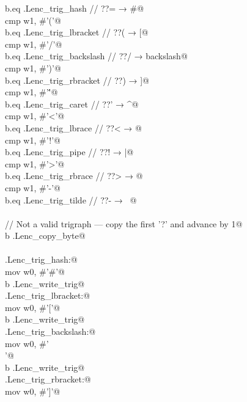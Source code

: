 \documentclass[11pt,a4paper,twoside,openright,DIV=15]{scrbook}
\theoremstyle{definition}
\theoremstyle{plain}
\theoremstyle{remark}
\begin{document}
\begin{flushleft}
\begin{minipage}{\linewidth}
\begin{list}{}{}
\mbox{}\verb@    b.eq .Lenc_trig_hash       // ??= → #@\\
\mbox{}\verb@    cmp w1, #'('@\\
\mbox{}\verb@    b.eq .Lenc_trig_lbracket   // ??( → [@\\
\mbox{}\verb@    cmp w1, #'/'@\\
\mbox{}\verb@    b.eq .Lenc_trig_backslash  // ??/ → backslash@\\
\mbox{}\verb@    cmp w1, #')'@\\
\mbox{}\verb@    b.eq .Lenc_trig_rbracket   // ??) → ]@\\
\mbox{}\verb@    cmp w1, #'\''@\\
\mbox{}\verb@    b.eq .Lenc_trig_caret      // ??' → ^@\\
\mbox{}\verb@    cmp w1, #'<'@\\
\mbox{}\verb@    b.eq .Lenc_trig_lbrace     // ??< → {@\\
\mbox{}\verb@    cmp w1, #'!'@\\
\mbox{}\verb@    b.eq .Lenc_trig_pipe       // ??! → |@\\
\mbox{}\verb@    cmp w1, #'>'@\\
\mbox{}\verb@    b.eq .Lenc_trig_rbrace     // ??> → }@\\
\mbox{}\verb@    cmp w1, #'-'@\\
\mbox{}\verb@    b.eq .Lenc_trig_tilde      // ??- → ~@\\
\mbox{}\verb@@\\
\mbox{}\verb@    // Not a valid trigraph — copy the first '?' and advance by 1@\\
\mbox{}\verb@    b .Lenc_copy_byte@\\
\mbox{}\verb@@\\
\mbox{}\verb@.Lenc_trig_hash:@\\
\mbox{}\verb@    mov w0, #'#'@\\
\mbox{}\verb@    b .Lenc_write_trig@\\
\mbox{}\verb@.Lenc_trig_lbracket:@\\
\mbox{}\verb@    mov w0, #'['@\\
\mbox{}\verb@    b .Lenc_write_trig@\\
\mbox{}\verb@.Lenc_trig_backslash:@\\
\mbox{}\verb@    mov w0, #'\\'@\\
\mbox{}\verb@    b .Lenc_write_trig@\\
\mbox{}\verb@.Lenc_trig_rbracket:@\\
\mbox{}\verb@    mov w0, #']'@\\

\end{list}
\end{minipage}
\end{flushleft}
\end{document}
